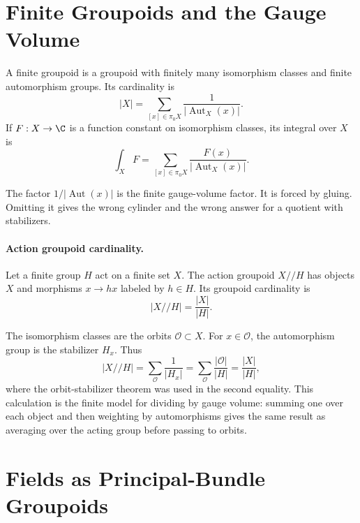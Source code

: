 \section{Finite Groupoids and the Gauge Volume}

\begin{definition}
\label{def:finite-groupoid-cardinality}
A finite groupoid is a groupoid with finitely many isomorphism classes and
finite automorphism groups.  Its cardinality is
\begin{equation}
  |X|
  =
  \sum_{[x]\in\pi_0X}
  \frac{1}{|\operatorname{Aut}_X(x)|}.
  \label{eq:finite-groupoid-cardinality}
\end{equation}
If \(F:X\to\C\) is a function constant on isomorphism classes, its integral
over \(X\) is
\begin{equation}
  \int_X F
  =
  \sum_{[x]\in\pi_0X}
  \frac{F(x)}{|\operatorname{Aut}_X(x)|}.
  \label{eq:finite-groupoid-integral}
\end{equation}
\end{definition}

The factor \(1/|\operatorname{Aut}(x)|\) is the finite gauge-volume factor.
It is forced by gluing.  Omitting it gives the wrong cylinder and the wrong
answer for a quotient with stabilizers.

\paragraph{Action groupoid cardinality.}
Let a finite group \(H\) act on a finite set \(X\).  The action groupoid
\(X//H\) has objects \(X\) and morphisms \(x\to h x\) labeled by
\(h\in H\).  Its groupoid cardinality is
\begin{equation}
  |X//H|=\frac{|X|}{|H|}.
  \label{eq:action-groupoid-cardinality}
\end{equation}

The isomorphism classes are the orbits \(\mathcal O\subset X\).  For
\(x\in\mathcal O\), the automorphism group is the stabilizer \(H_x\).  Thus
\[
  |X//H|
  =
  \sum_{\mathcal O}
  \frac{1}{|H_x|}
  =
  \sum_{\mathcal O}
  \frac{|\mathcal O|}{|H|}
  =
  \frac{|X|}{|H|},
\]
where the orbit-stabilizer theorem was used in the second equality.
This calculation is the finite model for dividing by gauge volume: summing
one over each object and then weighting by automorphisms gives the same result
as averaging over the acting group before passing to orbits.

\section{Fields as Principal-Bundle Groupoids}


